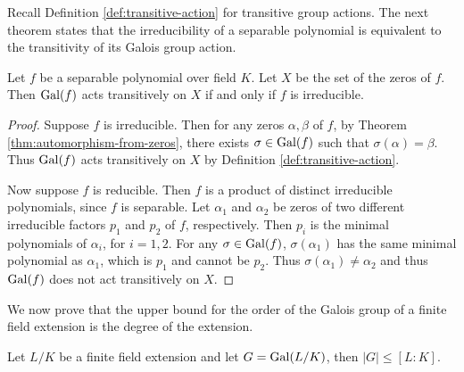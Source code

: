 Recall Definition \ref{def:transitive-action} for transitive group actions. The next theorem states that the irreducibility of a separable polynomial is equivalent to the transitivity of its Galois group action.

\begin{theorem} \label{thm:galois-action-transitive-irreducible}
	Let $f$ be a separable polynomial over field $K$. Let $X$ be the set of the zeros of $f$. Then $\operatorname{Gal}(f)$ acts transitively on $X$ if and only if $f$ is irreducible. 
\end{theorem}

\begin{proof}
	Suppose $f$ is irreducible. Then for any zeros $\alpha, \beta$ of $f$, by Theorem \ref{thm:automorphism-from-zeros}, there exists $\sigma \in \operatorname{Gal}(f)$ such that $\sigma(\alpha) = \beta$. Thus $\operatorname{Gal}(f)$ acts transitively on $X$ by Definition \ref{def:transitive-action}. 
	
	Now suppose $f$ is reducible. Then $f$ is a product of distinct irreducible polynomials, since $f$ is separable. Let $\alpha_1$ and $\alpha_2$ be zeros of two different irreducible factors $p_1$ and $p_2$ of $f$, respectively. Then $p_i$ is the minimal polynomials of $\alpha_i$, for $i = 1, 2$. For any $\sigma \in \operatorname{Gal}(f)$, $\sigma(\alpha_1)$ has the same minimal polynomial as $\alpha_1$, which is $p_1$ and cannot be $p_2$. Thus $\sigma(\alpha_1) \neq \alpha_2$ and thus $\operatorname{Gal}(f)$ does not act transitively on $X$. 
\end{proof}

\begin{example}
	\TODO
\end{example}



We now prove that the upper bound for the order of the Galois group of a finite field extension is the degree of the extension. 



\begin{theorem} \label{thm:galois-group-order-upper-bound}
	Let $L/K$ be a finite field extension and let $G = \operatorname{Gal}(L/K)$, then $|G| \le [L:K]$. 
\end{theorem}

